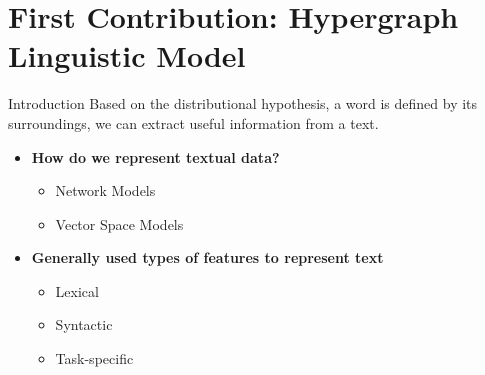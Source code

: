 \documentclass[10pt,xcolor=table]{beamer}
\begin{document}
\section{First Contribution: Hypergraph Linguistic Model}
%


\begin{frame}{Introduction}
\vspace{.5cm}
Based on the distributional hypothesis, a word is defined by its surroundings, we can extract useful information from a text.
\begin{itemize}[<+- | alert@+>]
	\item \textbf{How do we represent textual data?}
		\begin{itemize}
		\item Network Models \cite{2004.Mihalcea.SemanticNetworkPageRank}
		\item Vector Space Models \cite{manning1999foundations}

		
		\end{itemize}
	\vspace{.5cm}
	\item \textbf{Generally used types of features to represent text} 
		\begin{itemize}
		\item Lexical
		\item Syntactic
		\item Task-specific
		\end{itemize}
\end{itemize}
\vspace{\textheight}
\end{frame}
\end{document}
